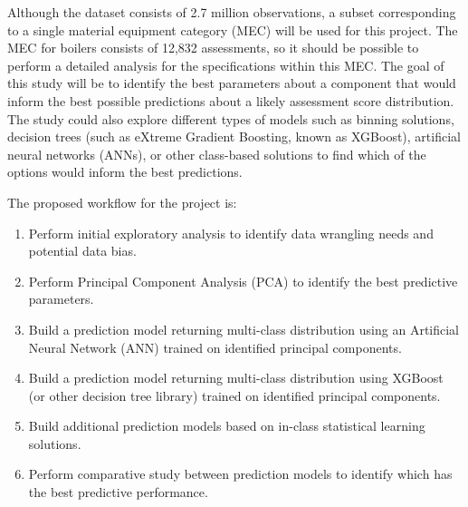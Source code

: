 \documentclass[Journal,letterpaper,NoPageNumbers,NoLineNumbers]{ascelike-new}
\begin{document}
Although the dataset consists of 2.7 million observations, a subset corresponding to a single material equipment category (MEC) will be used for this project. The MEC for boilers consists of 12,832 assessments, so it should be possible to perform a detailed analysis for the specifications within this MEC. The goal of this study will be to identify the best parameters about a component that would inform the best possible predictions about a likely assessment score distribution.  The study could also explore different types of models such as binning solutions, decision trees (such as eXtreme Gradient Boosting, known as XGBoost), artificial neural networks (ANNs), or other class-based solutions to find which of the options would inform the best predictions.

The proposed workflow for the project is:
\begin{enumerate}
\item Perform initial exploratory analysis to identify data wrangling needs and potential data bias.
\item Perform Principal Component Analysis (PCA) to identify the best predictive parameters.
\item Build a prediction model returning multi-class distribution using an Artificial Neural Network (ANN) trained on identified principal components.
\item Build a prediction model returning multi-class distribution using XGBoost (or other decision tree library) trained on identified principal components.
\item Build additional prediction models based on in-class statistical learning solutions.
\item Perform comparative study between prediction models to identify which has the best predictive performance.
\end{enumerate}
\end{document}
